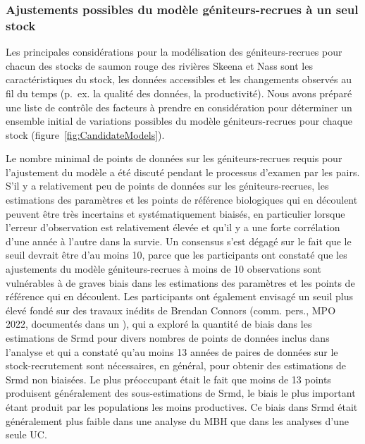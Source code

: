 \documentclass[french,11pt]{book}
\begin{document}
\subsubsection{Ajustements possibles du modèle géniteurs-recrues à un seul stock}\label{CandidateStockModels}

Les principales considérations pour la modélisation des géniteurs-recrues pour chacun des stocks de saumon rouge des rivières Skeena et Nass sont les caractéristiques du stock, les données accessibles et les changements observés au fil du temps (p.~ex. la qualité des données, la productivité). Nous avons préparé une liste de contrôle des facteurs à prendre en considération pour déterminer un ensemble initial de variations possibles du modèle géniteurs-recrues pour chaque stock (figure~\ref{fig:CandidateModels}).

Le nombre minimal de points de données sur les géniteurs-recrues requis pour l'ajustement du modèle a été discuté pendant le processus d'examen par les pairs. S'il y a relativement peu de points de données sur les géniteurs-recrues, les estimations des paramètres et les points de référence biologiques qui en découlent peuvent être très incertains et systématiquement biaisés, en particulier lorsque l'erreur d'observation est relativement élevée et qu'il y a une forte corrélation d'une année à l'autre dans la survie. Un consensus s'est dégagé sur le fait que le seuil devrait être d'au moins 10, parce que les participants ont constaté que les ajustements du modèle géniteurs-recrues à moins de 10 observations sont vulnérables à de graves biais dans les estimations des paramètres et les points de référence qui en découlent. Les participants ont également envisagé un seuil plus élevé fondé sur des travaux inédits de Brendan Connors (comm. pers., MPO 2022, documentés dans un ), qui a exploré la quantité de biais dans les estimations de Srmd pour divers nombres de points de données inclus dans l'analyse et qui a constaté qu'au moins 13 années de paires de données sur le stock-recrutement sont nécessaires, en général, pour obtenir des estimations de Srmd non biaisées. Le plus préoccupant était le fait que moins de 13 points produisent généralement des sous-estimations de Srmd, le biais le plus important étant produit par les populations les moins productives. Ce biais dans Srmd était généralement plus faible dans une analyse du MBH que dans les analyses d'une seule UC.
\end{document}
